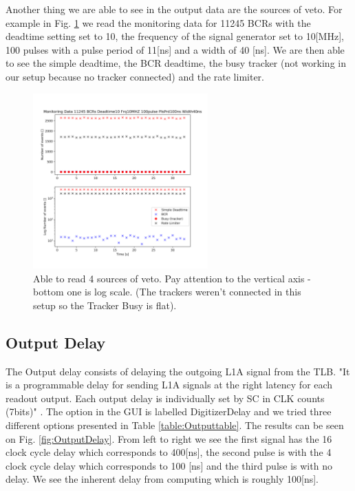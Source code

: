 Another thing we are able to see in the output data are the sources of veto. For example in Fig. \ref{fig:VetoSources} we read the monitoring data for 11245 BCRs with the deadtime setting set to 10, the frequency of the signal generator set to 10[MHz], 100 pulses with a pulse period of 11[ns] and a width of 40 [ns]. We are then able to see the simple deadtime, the BCR deadtime, the busy tracker (not working in our setup because no tracker connected) and the rate limiter.

\begin{figure}[htbp!] 
\centering    
\includegraphics[width=0.6\textwidth]{MonitoringData11245HzDeadtime10Frq10MHZ100pulsePlsPrd100nsWidth40ns.png}
\caption[Veto sources]{Able to read 4 sources of veto. Pay attention to the vertical axis - bottom one is log scale. (The trackers weren't connected in this setup so the Tracker Busy is flat).}
\label{fig:VetoSources}
\end{figure}

\subsection{Output Delay}

The Output delay consists of delaying the outgoing L1A signal from the TLB. "It is a programmable delay for sending L1A signals at the right latency for each readout output. Each output delay is individually set by SC in CLK counts (7bits)" \cite{debieux_trigger_2019}. The option in the GUI is labelled DigitizerDelay and we tried three different options presented in Table \ref{table:Outputtable}. The results can be seen on Fig. \ref{fig:OutputDelay}. From left to right we see the first signal has the 16 clock cycle delay which corresponds to 400[ns], the second pulse is with the 4 clock cycle delay which corresponds to 100 [ns] and the third pulse is with no delay. We see the inherent delay from computing which is roughly 100[ns].

